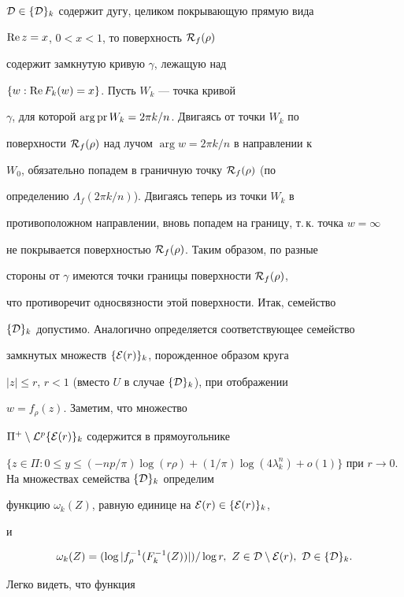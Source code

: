 \begin{pf}
${\cal D}\in \{{\cal D}\}_k$ содержит дугу, целиком покрывающую прямую вида


$\operatorname{Re} z=x$, $0<x<1$, то поверхность ${\cal R}_f(\rho)$


содержит замкнутую кривую $\gamma$, лежащую над


$\{w: \operatorname{Re} F_k(w)=x\}$. Пусть $W_k$ --- точка кривой


$\gamma$, для которой $\arg \operatorname{pr} W_k=2\pi k/n$. Двигаясь от точки $W_k$ по


поверхности ${\cal R}_f(\rho)$ над лучом $\arg w=2\pi k/n$ в направлении к


$W_0$, обязательно попадем в граничную точку ${\cal R}_f(\rho)$ (по


определению $\Lambda_f(2\pi k/n)$). Двигаясь теперь из точки $W_k$ в


противоположном направлении, вновь попадем на границу, т.\,к. точка $w=\infty$


не покрывается поверхностью ${\cal R}_f(\rho)$. Таким образом, по разные


стороны от $\gamma$ имеются точки границы поверхности ${\cal R}_f(\rho)$,


что противоречит односвязности этой поверхности. Итак, семейство


$\{{\cal D}\}_k$ допустимо. Аналогично определяется соответствующее семейство


замкнутых множеств $\{{\cal E}(r)\}_k$, порожденное образом круга


$|z|\leq r$, $r<1$ (вместо $U$ в случае $\{{\cal D}\}_k$), при отображении


$w=f_{\rho}(z)$. Заметим, что множество


$\Pi^+\setminus {\cal L}^p\{{\cal E}(r)\}_k$ содержится в прямоугольнике


$\{z\in \Pi: 0\leq y\leq(-np/\pi)\log (r\rho)+(1/\pi)\log (4\lambda_k^n)+


o(1)\}$ при $r\to 0$. На множествах семейства $\{{\cal D}\}_k$ определим


функцию $\omega_k(Z)$, равную единице на ${\cal E}(r)\in \{{\cal E}(r)\}_k$,


и


$$


\omega_k(Z)=(\log|f_\rho^{-1}(F_k^{-1}(Z))|)/ \log r,\


Z\in{\cal D}\setminus


{\cal E}(r),\ {\cal D}\in \{{\cal D}\}_k.


$$


Легко видеть, что функция



\end{pf}
